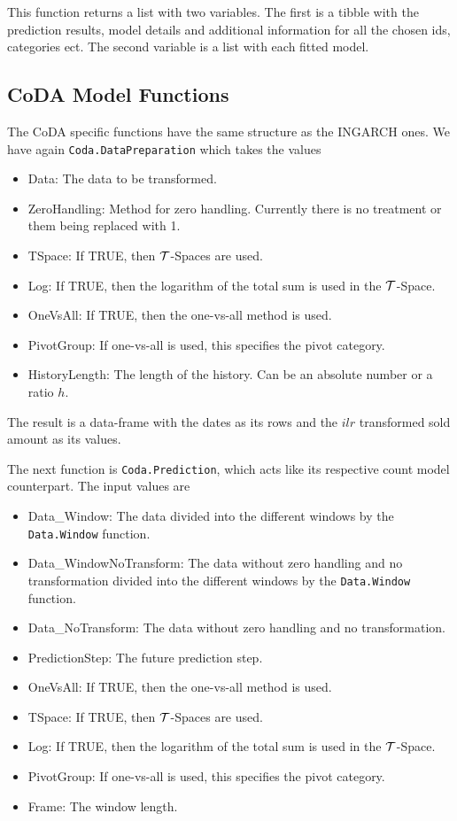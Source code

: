This function returns a list with two variables. The first is a tibble with the prediction results, model details and additional information for all the chosen ids, categories ect. The second variable is a list with each fitted model. 

\subsection{CoDA Model Functions}
\label{sec:Coda Model Functions}

The CoDA specific functions have the same structure as the INGARCH ones. We have again \texttt{Coda.DataPreparation} which takes the values

\begin{itemize}
  \item Data: The data to be transformed.
  \item ZeroHandling: Method for zero handling.  Currently there is no treatment or them being replaced with 1. 
  \item TSpace: If TRUE, then $\mathcal{T}$-Spaces are used.
  \item Log: If TRUE, then the logarithm of the total sum is used in the $\mathcal{T}$-Space.
  \item OneVsAll: If TRUE, then the one-vs-all method is used.
  \item PivotGroup: If one-vs-all is used, this specifies the pivot category.
  \item HistoryLength: The length of the history. Can be an absolute number or a ratio $h$.
\end{itemize}

The result is a data-frame with the dates as its rows and the $ilr$ transformed sold amount as its values.

The next function is \texttt{Coda.Prediction}, which acts like its respective count model counterpart. The input values are 

\begin{itemize}
	\item Data\_Window: The data divided into the different windows by the \texttt{Data.Window} function.
	\item Data\_WindowNoTransform: The data without zero handling and no transformation divided into the different windows by the \texttt{Data.Window} function.
	\item Data\_NoTransform: The data without zero handling and no transformation.
	\item PredictionStep: The future prediction step.
	\item OneVsAll: If TRUE, then the one-vs-all method is used.
	\item TSpace: If TRUE, then $\mathcal{T}$-Spaces are used.
	\item Log: If TRUE, then the logarithm of the total sum is used in the $\mathcal{T}$-Space.
	\item PivotGroup: If one-vs-all is used, this specifies the pivot category.
	\item Frame: The window length.
\end{itemize}


